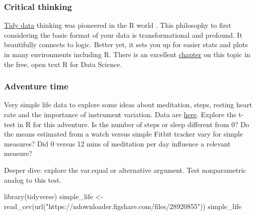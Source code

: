 \documentclass[
]{book}
\newenvironment{Shaded}{\begin{snugshade}}{\end{snugshade}}
\newcommand{\FunctionTok}[1]{\textcolor[rgb]{0.00,0.00,0.00}{#1}}
\newcommand{\NormalTok}[1]{#1}
\newcommand{\OtherTok}[1]{\textcolor[rgb]{0.56,0.35,0.01}{#1}}
\newcommand{\StringTok}[1]{\textcolor[rgb]{0.31,0.60,0.02}{#1}}
\begin{document}
\hypertarget{critical-thinking}{%
\subsubsection*{Critical thinking}\label{critical-thinking}}

\href{https://www.jstatsoft.org/article/view/v059i10}{Tidy data} thinking was pioneered in the R world \citep{RN4416}. This philosophy to first considering the basic format of your data is transformational and profound. It beautifully connects to logic. Better yet, it sets you up for easier stats and plots in many environments including R. There is an excellent \href{https://r4ds.had.co.nz/tidy-data.html}{chapter} on this topic in the free, open text R for Data Science.

\hypertarget{adventure-time}{%
\subsubsection*{Adventure time}\label{adventure-time}}

Very simple life data to explore some ideas about meditation, steps, resting heart rate and the importance of instrument variation. Data are \href{https://figshare.com/articles/dataset/Simple_health_data/15040515}{here}. Explore the t-test in R for this adventure. Is the number of steps or sleep different from 0? Do the means estimated from a watch versus simple Fitbit tracker vary for simple measures? Did 0 versus 12 mins of meditation per day influence a relevant measure?

Deeper dive: explore the var.equal or alternative argument. Test nonparametric analog to this test.

\begin{Shaded}
\begin{Highlighting}[]
\FunctionTok{library}\NormalTok{(tidyverse)}
\NormalTok{simple\_life }\OtherTok{\textless{}{-}} \FunctionTok{read\_csv}\NormalTok{(}\FunctionTok{url}\NormalTok{(}\StringTok{"https://ndownloader.figshare.com/files/28920855"}\NormalTok{))}
\NormalTok{simple\_life}
\end{Highlighting}
\end{Shaded}
\end{document}
